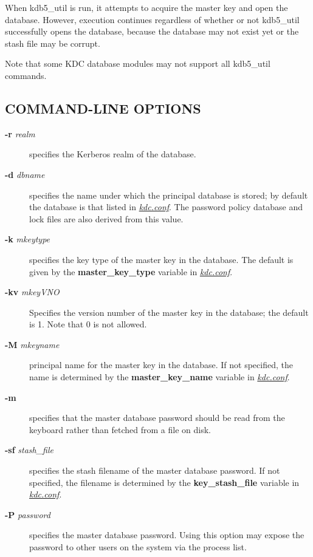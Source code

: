 \documentclass[letterpaper,10pt,english]{sphinxmanual}
\begin{document}
When kdb5\_util is run, it attempts to acquire the master key and open
the database.  However, execution continues regardless of whether or
not kdb5\_util successfully opens the database, because the database
may not exist yet or the stash file may be corrupt.

Note that some KDC database modules may not support all kdb5\_util
commands.


\subsection{COMMAND-LINE OPTIONS}
\label{admin/admin_commands/kdb5_util:command-line-options}\label{admin/admin_commands/kdb5_util:kdb5-util-options}\begin{description}
\item[{\textbf{-r} \emph{realm}}] \leavevmode
specifies the Kerberos realm of the database.

\item[{\textbf{-d} \emph{dbname}}] \leavevmode
specifies the name under which the principal database is stored;
by default the database is that listed in {\hyperref[admin/conf_files/kdc_conf:kdc-conf-5]{\emph{kdc.conf}}}.  The
password policy database and lock files are also derived from this
value.

\item[{\textbf{-k} \emph{mkeytype}}] \leavevmode
specifies the key type of the master key in the database.  The
default is given by the \textbf{master\_key\_type} variable in
{\hyperref[admin/conf_files/kdc_conf:kdc-conf-5]{\emph{kdc.conf}}}.

\item[{\textbf{-kv} \emph{mkeyVNO}}] \leavevmode
Specifies the version number of the master key in the database;
the default is 1.  Note that 0 is not allowed.

\item[{\textbf{-M} \emph{mkeyname}}] \leavevmode
principal name for the master key in the database.  If not
specified, the name is determined by the \textbf{master\_key\_name}
variable in {\hyperref[admin/conf_files/kdc_conf:kdc-conf-5]{\emph{kdc.conf}}}.

\item[{\textbf{-m}}] \leavevmode
specifies that the master database password should be read from
the keyboard rather than fetched from a file on disk.

\item[{\textbf{-sf} \emph{stash\_file}}] \leavevmode
specifies the stash filename of the master database password.  If
not specified, the filename is determined by the
\textbf{key\_stash\_file} variable in {\hyperref[admin/conf_files/kdc_conf:kdc-conf-5]{\emph{kdc.conf}}}.

\item[{\textbf{-P} \emph{password}}] \leavevmode
specifies the master database password.  Using this option may
expose the password to other users on the system via the process
list.

\end{description}
\end{document}
